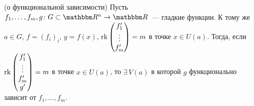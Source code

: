 \documentclass[12pt,timbord]{../../../notes}
\begin{document}
\begin{thrm}(о функциональной зависимости)\label{thrm:diffspace::funcdep}
  Пусть $f_1, \dotsc, f_m, g \colon G \subset \R^n \to \R$~--- гладкие функции. К тому же
  $a\in G$, $f = (f_i)_i$, $y = f(x)$, 
  $
    \operatorname{rk} \begin{pmatrix}
      f_1' \\ \vdots \\ f_m' 
    \end{pmatrix} = m
  $ в точке $x\in U(a)$.
  Тогда, если 
  $
    \operatorname{rk} \begin{pmatrix}
      f_1' \\ \vdots \\ f_m' \\ g' 
    \end{pmatrix} = m
  $ в точке $x \in U(a)$, то $\exists\, V(a)$ в которой $g$ функционально зависит от $f_1, \dotsc,
  f_m$.
\end{thrm}
\end{document}
